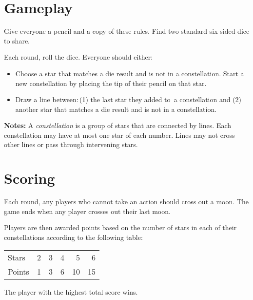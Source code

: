 \section*{Gameplay}
%

Give everyone a pencil and a copy of these rules. Find two standard six-sided dice to share.

Each round, roll the dice. Everyone should either:
\begin{itemize}[leftmargin=*]
	\item Choose a star that matches a die result and is not in a constellation. Start a new constellation by placing the tip of their pencil on that star.%
	\item Draw a line between:\,(1) the last star they added to~a constellation and (2) another star that matches a die result and is not in a constellation.
\end{itemize}


\vfill

\textbf{Notes:} A \emph{constellation} is a group of stars that are connected by lines. Each constellation may have at most one star of each number. Lines may not cross other lines or pass through intervening stars.\vfill\null\columnbreak

\section*{Scoring}
Each round, any players who cannot take an action should cross out a moon. The game ends when any player crosses out their last moon.

Players are then awarded points based on the number of stars in each of their constellations according to the following table:

\begin{center}
\begin{tabular}{l rrrrr} \toprule[0.5pt]
Stars & 2 & 3 & 4 & 5 & 6 \\
Points & \phantom{1}1 & \phantom{1}3 &\phantom{1}6 & 10 & 15 \\ \bottomrule[0.5pt]
\end{tabular}
\end{center}

The player with the highest total score wins.
